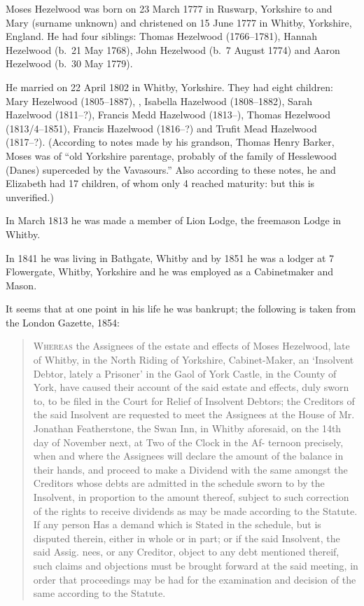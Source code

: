 
Moses Hezelwood was born on 23 March 1777 in Ruswarp, Yorkshire to  and Mary (surname unknown)
and christened on 15 June 1777 in Whitby, Yorkshire, England.\cite{MHezelwoodBirth}
He had four siblings: Thomas Hezelwood (1766--1781), Hannah Hezelwood (b.\ 21 May 1768), John Hezelwood (b.\ 7 August 1774) and Aaron Hezelwood (b.\ 30 May 1779).

He married  on 22 April 1802 in Whitby, Yorkshire.\cite{MHezelwoodMarriage}
They had eight children: Mary Hezelwood (1805--1887), , Isabella Hazelwood (1808--1882),
Sarah Hazelwood (1811--?), Francis Medd Hazelwood (1813--), Thomas Hezelwood (1813/4--1851), Francis Hazelwood (1816--?)
and Trufit Mead Hazelwood (1817--?). (According to notes made by his grandson, Thomas Henry Barker, Moses  was of
``old Yorkshire parentage, probably of the family of Hesslewood (Danes) superceded by the Vavasours.''
Also according to these notes, he and Elizabeth had 17 children, of whom only 4 reached maturity: but this is unverified.)

In March 1813 he was made a member of Lion Lodge, the freemason Lodge in Whitby.\cite{MasonicCert1813}

In 1841 he was living in Bathgate, Whitby\cite{MHezelwood1841} and by 1851 he was a lodger at 7 Flowergate, Whitby, Yorkshire
and he was employed as a Cabinetmaker and Mason.\cite{MHezelwood1851}

It seems that at one point in his life he was bankrupt; the following is taken from the London Gazette, 1854:\cite{MHezelwoodBankruptcy}

\begin{quotation}
\textsc{Whereas} the Assignees of the estate and effects of Moses Hezelwood, late of Whitby,
in the North Riding of Yorkshire, Cabinet-Maker, an `Insolvent Debtor, lately a Prisoner'
in the Gaol of York Castle, in the County of York, have caused their account of the said estate and effects,
duly sworn to, to be filed in the Court for Relief of Insolvent Debtors;
the Creditors of the said Insolvent are requested to meet the Assignees at the House of Mr. Jonathan Featherstone, the Swan Inn, in Whitby aforesaid, on the 14th day of November next, at Two of the Clock in the Af- ternoon precisely, when and where the Assignees will declare the amount of the balance in their hands, and proceed to make a Dividend with the same amongst the Creditors whose debts are admitted in the schedule sworn to by the Insolvent, in proportion to the amount thereof, subject to such correction of the rights to receive dividends as may be made according to the Statute. If any person Has a demand which is Stated in the schedule, but is disputed therein, either in whole or in part; or if the said Insolvent, the said Assig. nees, or any Creditor, object to any debt mentioned thereif, such claims and objections must be brought forward at the said meeting, in order that proceedings may be had for the examination and decision of the same according to the Statute.
\end{quotation}

